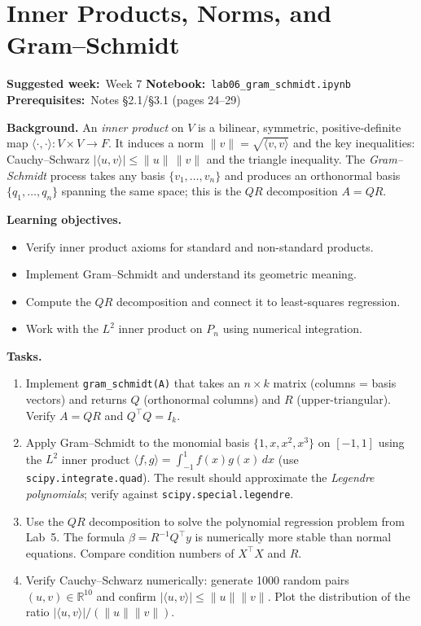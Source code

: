 \documentclass[11pt, a4paper]{article}
\newcommand{\labmeta}[3]{%
  \begin{prereqbox}
  \textbf{Suggested week:}~#1 \quad
  \textbf{Notebook:}~\texttt{#2} \quad
  \textbf{Prerequisites:}~#3
  \end{prereqbox}
  \vspace{4pt}
}
\newcommand{\objectives}[1]{%
  \textbf{\color{prereqcolor}Learning objectives.}\vspace{2pt}
  \begin{itemize}[leftmargin=1.6em, itemsep=1pt] #1 \end{itemize}
}
\newcommand{\tasks}[1]{%
  \begin{taskbox}
  \textbf{\color{taskcolor}Tasks.}
  \begin{enumerate}[leftmargin=1.6em, itemsep=3pt] #1 \end{enumerate}
  \end{taskbox}
}
\begin{document}
\section{Inner Products, Norms, and Gram--Schmidt}
\label{lab:gramschmidt}

\labmeta{Week 7}{lab06\_gram\_schmidt.ipynb}{Notes §2.1/§3.1 (pages 24--29)}

\vspace{4pt}

\noindent\textbf{Background.}
An \emph{inner product} on $V$ is a bilinear, symmetric, positive-definite map
$\langle \cdot, \cdot \rangle: V \times V \to F$.  It induces a norm
$\|v\| = \sqrt{\langle v, v\rangle}$ and the key inequalities: Cauchy--Schwarz
$|\langle u, v\rangle| \leq \|u\|\,\|v\|$ and the triangle inequality.
The \emph{Gram--Schmidt} process takes any basis $\{v_1,\ldots,v_n\}$ and
produces an orthonormal basis $\{q_1,\ldots,q_n\}$ spanning the same space;
this is the $QR$ decomposition $A = QR$.

\objectives{
  \item Verify inner product axioms for standard and non-standard products.
  \item Implement Gram--Schmidt and understand its geometric meaning.
  \item Compute the $QR$ decomposition and connect it to least-squares regression.
  \item Work with the $L^2$ inner product on $P_n$ using numerical integration.
}

\tasks{
  \item Implement \texttt{gram\_schmidt(A)} that takes an $n \times k$ matrix
        (columns = basis vectors) and returns $Q$ (orthonormal columns) and $R$
        (upper-triangular).  Verify $A = QR$ and $Q^\top Q = I_k$.
  \item Apply Gram--Schmidt to the monomial basis $\{1, x, x^2, x^3\}$ on $[-1,1]$
        using the $L^2$ inner product $\langle f, g \rangle = \int_{-1}^1 f(x)g(x)\,dx$
        (use \texttt{scipy.integrate.quad}).
        The result should approximate the \emph{Legendre polynomials}; verify against
        \texttt{scipy.special.legendre}.
  \item Use the $QR$ decomposition to solve the polynomial regression problem from
        Lab~5.  The formula $\beta = R^{-1}Q^\top y$ is numerically more stable than
        normal equations.  Compare condition numbers of $X^\top X$ and $R$.
  \item Verify Cauchy--Schwarz numerically: generate 1000 random pairs
        $(u,v) \in \mathbb{R}^{10}$ and confirm $|\langle u,v\rangle| \leq \|u\|\|v\|$.
        Plot the distribution of the ratio $|\langle u,v\rangle|/(\|u\|\|v\|)$.
}
\end{document}
